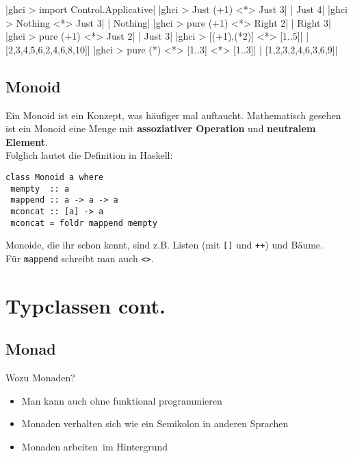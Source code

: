 \documentclass{beamer}
\begin{document}
\begin{frame}[fragile]
|ghci > import Control.Applicative|
|ghci > Just (+1) <*> Just 3|
\pause
{}|       Just 4|
|ghci > Nothing <*> Just 3|
\pause
{}|       Nothing|
|ghci > pure (+1) <*> Right 2|
\pause
{}|       Right 3|
|ghci > pure (+1) <*> Just 2|
\pause
{}|       Just 3|
|ghci > [(+1),(*2)] <*> [1..5]|
\pause
{}|       [2,3,4,5,6,2,4,6,8,10]|
|ghci > pure (*) <*> [1..3] <*> [1..3]|
\pause
{}|       [1,2,3,2,4,6,3,6,9]|
\end{frame}


\subsection{Monoid}
\begin{frame}[fragile]
Ein Monoid ist ein Konzept, was häufiger mal auftaucht. Mathematisch gesehen ist ein Monoid eine Menge mit \textbf{assoziativer Operation} und \textbf{neutralem Element}.\\
Folglich lautet die Definition in Haskell:
\begin{verbatim}
class Monoid a where
 mempty  :: a
 mappend :: a -> a -> a
 mconcat :: [a] -> a
 mconcat = foldr mappend mempty
\end{verbatim}
\pause
Monoide, die ihr schon kennt, sind z.B. Listen (mit \texttt{[]} und \texttt{++}) und Bäume.\\
\pause
Für \texttt{mappend} schreibt man auch \texttt{<>}.
\end{frame}


\section{Typclassen cont.}

\subsection{Monad}
\begin{frame}
Wozu Monaden?
\pause
\begin{itemize}
 \item Man kann auch ohne funktional programmieren
 \pause
 \item Monaden verhalten sich wie ein Semikolon in anderen Sprachen
 \pause
 \item Monaden \glqq arbeiten\grqq \ im Hintergrund
\end{itemize}

\end{frame}
\end{document}
